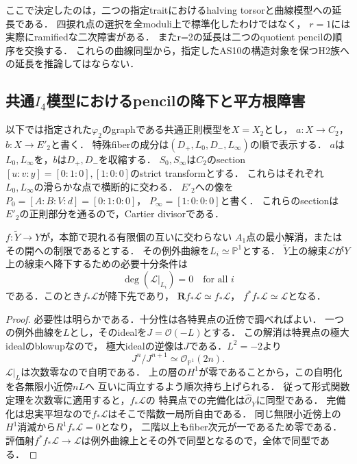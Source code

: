 \begin{remark}[局所補正と全体の標準性]
ここで決定したのは，二つの指定traitにおけるhalving torsorと曲線模型への延長である．
四捩れ点の選択を全moduli上で標準化したわけではなく，
$r=1$には実際にramifiedな二次障害がある．
またr=2の延長は二つのquotient pencilの順序を交換する．
これらの曲線同型から，指定したAS10の構造対象を保つH2族への延長を推論してはならない．
\end{remark}

\subsection{共通\texorpdfstring{$I_4$}{I4}模型におけるpencilの降下と平方根障害}
\label{subsec:qa-boundary-pencils-descent}

以下では指定された$\varphi_2$のgraphである共通正則模型を$X=X_2$とし，
$a:X\to C_2$，$b:X\to E'_2$と書く．
特殊fiberの成分は$(D_+,L_0,D_-,L_\infty)$の順で表示する．
$a$は$L_0,L_\infty$を，$b$は$D_+,D_-$を収縮する．
$S_0,S_\infty$は$C_2$のsection
$[u:v:y]=[0:1:0],[1:0:0]$のstrict transformとする．
これらはそれぞれ$L_0,L_\infty$の滑らかな点で横断的に交わる．
$E'_2$への像を$P_0=[A:B:V:d]=[0:1:0:0]$，
$P_\infty=[1:0:0:0]$と書く．
これらのsectionは$E'_2$の正則部分を通るので，Cartier divisorである．

\begin{lemma}[$A_1$収縮に対する線束の降下]
\label{lem:qa-a1-line-bundle-descent}
$f:\widetilde Y\to Y$が，本節で現れる有限個の互いに交わらない
$A_1$点の最小解消，またはその開への制限であるとする．
その例外曲線を$L_i\simeq\mathbb P^1$とする．
$\widetilde Y$上の線束$\mathcal L$が$Y$上の線束へ降下するための必要十分条件は
\[
 \deg(\mathcal L|_{L_i})=0\quad\text{for all }i
\]
である．このとき$f_*\mathcal L$が降下先であり，
$\mathbf Rf_*\mathcal L\simeq f_*\mathcal L$，
$f^*f_*\mathcal L\simeq\mathcal L$となる．
\end{lemma}
\begin{proof}
必要性は明らかである．十分性は各特異点の近傍で調べればよい．
一つの例外曲線を$L$とし，そのidealを$J=\mathcal O(-L)$とする．
この解消は特異点の極大idealのblowupなので，
極大idealの逆像は$J$である．$L^2=-2$より
\[
 J^n/J^{n+1}\simeq\mathcal O_{\mathbb P^1}(2n).
\]
$\mathcal L|_L$は次数零なので自明である．
上の層の$H^1$が零であることから，この自明化を各無限小近傍$nL$へ
互いに両立するよう順次持ち上げられる．
従って形式関数定理を次数零に適用すると，$f_*\mathcal L$の
特異点での完備化は$\widehat{\mathcal O}_{Y}$に同型である．
完備化は忠実平坦なので$f_*\mathcal L$はそこで階数一局所自由である．
同じ無限小近傍上の$H^1$消滅から$R^1f_*\mathcal L=0$となり，
二階以上もfiber次元が一であるため零である．
評価射$f^*f_*\mathcal L\to\mathcal L$は例外曲線上とその外で同型となるので，全体で同型である．
\end{proof}

